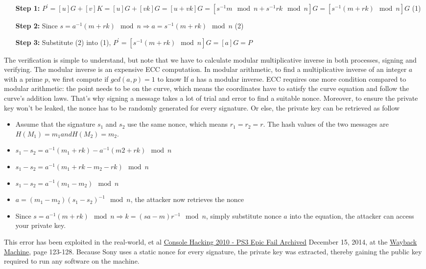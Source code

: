\begin{itemize}[leftmargin=2.2cm]
  \item[\textbf{Step 1:}] $P^\prime = [u]G + [v]K = [u]G + [vk]G = [u +vk]G = [s^{-1}m \mod n + s^{-1}rk \mod n]G = [s^{-1}(m + rk) \mod n]G$ (1)
  \item[\textbf{Step 2:}] Since $s = a^{-1}(m+rk) \mod n \Rightarrow a = s^{-1}(m+rk) \mod n$ (2)
  \item[\textbf{Step 3:}] Substitute (2) into (1), $P^\prime = [s^{-1}(m + rk) \mod n]G = [a]G = P$
\end{itemize}

The verification is simple to understand, but note that we have to calculate modular multiplicative inverse in both processes, signing and verifying. The modular inverse is an expensive ECC computation. In modular arithmetic, to find a multiplicative inverse of an integer $a$ with a prime $p$, we first compute if $gcd(a, p) = 1$ to know If $a$ has a modular inverse. ECC requires one more condition compared to modular arithmetic: the point needs to be on the curve, which means the coordinates have to satisfy the curve equation and follow the curve’s addition laws. That’s why signing a message takes a lot of trial and error to find a suitable nonce. Moreover, to ensure the private key won’t be leaked, the nonce has to be randomly generated for every signature. Or else, the private key can be retrieved as follow

\begin{itemize}
  \item Assume that the signature $s_1$ and $s_2$ use the same nonce, which means $r_1 = r_2 = r$. The hash values of the two messages are $H(M_1) = m_1 and H(M_2) = m_2$.
  \item $s_1 - s_2 = a^{-1} (m_1 + rk) - a^{-1} (m2+rk) \mod n$
  \item $s_1 - s_2 = a^{-1}(m_1 + rk - m_2 - rk) \mod n$
  \item $s_1 - s_2 = a^{-1}(m_1 - m_2) \mod n$
  \item $a = (m_1 - m_2)(s_1 - s_2)^{-1} \mod n$, the attacker now retrieves the nonce
  \item Since $s = a^{-1}(m + rk) \mod n \Rightarrow k = (sa-m) r^{-1} \mod n$, simply substitute nonce $a$ into the equation, the attacker can access your private key.
\end{itemize}

This error has been exploited in the real-world, et al \href{https://events.ccc.de/congress/2010/Fahrplan/attachments/1780_27c3_console_hacking_2010.pdf}{Console Hacking 2010 - PS3 Epic Fail Archived} December 15, 2014, at the \href{https://en.wikipedia.org/wiki/Wayback_Machine}{Wayback Machine}, page 123-128. Because Sony uses a static nonce for every signature, the private key was extracted, thereby gaining the public key required to run any software on the machine.


